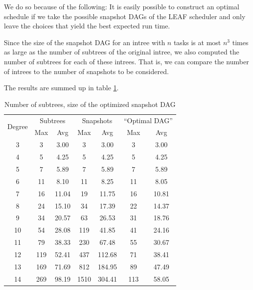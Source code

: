 We do so because of the following: It is easily possible to construct an optimal schedule if we take the possible snapshot DAGs of the LEAF scheduler and only leave the choices that yield the best expected run time.

Since the size of the snapshot DAG for an intree with $n$ tasks is at most $n^3$ times as large as the number of subtrees of the original intree, we also computed the number of subtrees for each of these intrees.
That is, we can compare the number of intrees to the number of snapshots to be considered.

The results are summed up in table \ref{tab:num-subtrees-size-of-dags}.

\begin{table}[ht]
  \centering
  \begin{tabular}[ht]{ccccccc}
    \multirow{2}{*}{Degree} & \multicolumn{2}{c}{Subtrees} & \multicolumn{2}{c}{Snapshots} & \multicolumn{2}{c}{``Optimal DAG''} \\
    & Max & Avg & Max & Avg & Max & Avg \\
    \hline
    3 & 3 & 3.00 & 3 & 3.00 & 3 & 3.00  \\
    4 & 5 & 4.25 & 5 & 4.25 & 5 & 4.25  \\
    5 & 7 & 5.89 & 7 & 5.89 & 7 & 5.89  \\
    6 & 11 & 8.10 & 11 & 8.25 & 11 & 8.05  \\
    7 & 16 & 11.04 & 19 & 11.75 & 16 & 10.81  \\
    8 & 24 &  15.10 & 34 & 17.39 & 22 & 14.37  \\
    9 & 34 &  20.57 & 63 & 26.53 & 31 & 18.76  \\
    10 & 54 &  28.08 & 119 & 41.85 & 41 & 24.16  \\
    11 & 79 &  38.33 & 230 & 67.48 & 55 & 30.67  \\
    12 & 119 & 52.41 & 437 & 112.68 & 71 & 38.41  \\
    13 & 169 &  71.69 & 812 & 184.95 & 89 & 47.49  \\
    14 & 269 &  98.19 & 1510 & 304.41 & 113 & 58.05  \\
  \end{tabular}
  \caption{Number of subtrees, size of the optimized snapshot DAG}
  \label{tab:num-subtrees-size-of-dags}
\end{table}

